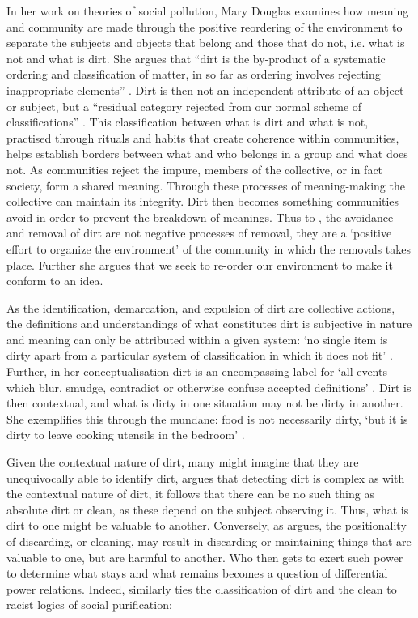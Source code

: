 In her work on theories of social pollution, Mary Douglas \citeyearpar{Douglas:1966} examines how meaning and community are made through the positive reordering of the environment to separate the subjects and objects that belong and those that do not, i.e.
what is not and what is dirt.
She argues that ``dirt is the by-product of a systematic ordering and classification of matter, in so far as ordering involves rejecting inappropriate elements'' \citep{Douglas:1966}.
Dirt is then not an independent attribute of an object or subject, but a ``residual category rejected from our normal scheme of classifications'' \citep{Douglas:1966}.
This classification between what is dirt and what is not, practised through rituals and habits that create coherence within communities, helps establish borders between what and who belongs in a group and what does not.
As communities reject the impure, members of the collective, or in fact society, form a shared meaning.
Through these processes of meaning-making the collective can maintain its integrity.
Dirt then becomes something communities avoid in order to prevent the breakdown of meanings.
Thus to \citet{Douglas:1966}, the avoidance and removal of dirt are not negative processes of removal, they are a `positive effort to organize the environment' \citep{Douglas:1966} of the community in which the removals takes place.
Further she argues that we seek to re-order our environment to make it conform to an idea.

As the identification, demarcation, and expulsion of dirt are collective actions, the definitions and understandings of what constitutes dirt is subjective in nature and meaning can only be attributed within a given system: `no single item is dirty apart from a particular system of classification in which it does not fit' \citep{Douglas:1966}.
Further, in her conceptualisation dirt is an encompassing label for `all events which blur, smudge, contradict or otherwise confuse accepted definitions' \citep{Douglas:1966}.
Dirt is then contextual, and what is dirty in one situation may not be dirty in another.
She exemplifies this through the mundane: food is not necessarily dirty, `but it is dirty to leave cooking utensils in the bedroom' \citep{Douglas:1966}.

Given the contextual nature of dirt, many might imagine that they are unequivocally able to identify dirt, \citet{Douglas:1966} argues that detecting dirt is complex as with the contextual nature of dirt, it follows that there can be no such thing as absolute dirt or clean, as these depend on the subject observing it.
Thus, what is dirt to one might be valuable to another.
Conversely, as \citet{Lepawsky:2019} argues, the positionality of discarding, or cleaning, may result in discarding or maintaining things that are valuable to one, but are harmful to another.
Who then gets to exert such power to determine what stays and what remains becomes a question of differential power relations.
Indeed, \citet{Hall:1997} similarly ties the classification of dirt and the clean to racist logics of social purification:

